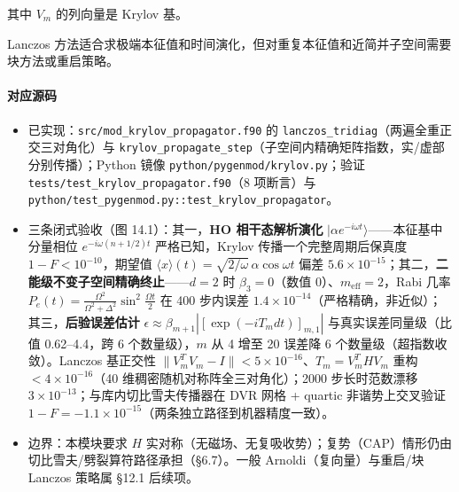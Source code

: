 \documentclass[
]{ctexbook}
\providecommand{\tightlist}{%
  \setlength{\itemsep}{0pt}\setlength{\parskip}{0pt}}
\begin{document}
其中 \(V_m\) 的列向量是 Krylov 基。

Lanczos
方法适合求极端本征值和时间演化，但对重复本征值和近简并子空间需要块方法或重启策略。

\hypertarget{ux5bf9ux5e94ux6e90ux7801-57}{%
\paragraph{对应源码}\label{ux5bf9ux5e94ux6e90ux7801-57}}

\begin{itemize}
\tightlist
\item
  已实现：\texttt{src/mod\_krylov\_propagator.f90} 的
  \texttt{lanczos\_tridiag}（两遍全重正交三对角化）与
  \texttt{krylov\_propagate\_step}（子空间内精确矩阵指数，实/虚部分别传播）；Python
  镜像 \texttt{python/pygenmod/krylov.py}；验证
  \texttt{tests/test\_krylov\_propagator.f90}（8 项断言）与
  \texttt{python/test\_pygenmod.py::test\_krylov\_propagator}。
\item
  三条闭式验收（图 14.1）：其一，\textbf{HO 相干态解析演化}
  \(|\alpha e^{-i\omega t}\rangle\)------本征基中分量相位
  \(e^{-i\omega(n+1/2)t}\) 严格已知，Krylov 传播一个完整周期后保真度
  \(1-F<10^{-10}\)，期望值
  \(\langle x\rangle(t)=\sqrt{2/\omega}\,\alpha\cos\omega t\) 偏差
  \(5.6\times10^{-15}\)；其二，\textbf{二能级不变子空间精确终止}------\(d=2\)
  时 \(\beta_3=0\)（数值 0）、\(m_{\mathrm{eff}}=2\)，Rabi 几率
  \(P_e(t)=\frac{\Omega^2}{\Omega^2+\Delta^2}\sin^2\frac{\Omega t}{2}\)
  在 400 步内误差
  \(1.4\times10^{-14}\)（严格精确，非近似）；其三，\textbf{后验误差估计}
  \(\epsilon\approx\beta_{m+1}|[\exp(-iT_m dt)]_{m,1}|\)
  与真实误差同量级（比值 0.62--4.4，跨 6 个数量级），\(m\) 从 4 增至 20
  误差降 6 个数量级（超指数收敛）。Lanczos 基正交性
  \(\|V_m^{T}V_m-I\|<5\times10^{-16}\)、\(T_m=V_m^{T}HV_m\) 重构
  \(<4\times10^{-16}\)（40 维稠密随机对称阵全三对角化）；2000
  步长时范数漂移 \(3\times10^{-13}\)；与库内切比雪夫传播器在 DVR 网格 +
  quartic 非谐势上交叉验证
  \(1-F=-1.1\times10^{-15}\)（两条独立路径到机器精度一致）。
\item
  边界：本模块要求 \(H\)
  实对称（无磁场、无复吸收势）；复势（CAP）情形仍由切比雪夫/劈裂算符路径承担（§6.7）。一般
  Arnoldi（复向量）与重启/块 Lanczos 策略属 §12.1 后续项。
\end{itemize}
\end{document}
